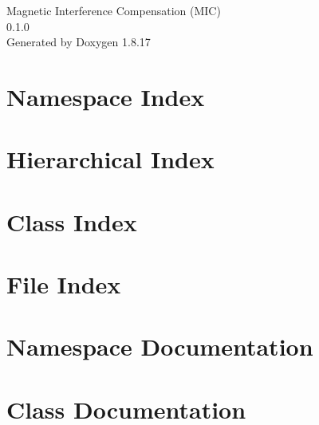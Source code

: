 \let\mypdfximage\pdfximage\def\pdfximage{\immediate\mypdfximage}\documentclass[twoside]{book}
\newcommand{\+}{\discretionary{\mbox{\scriptsize$\hookleftarrow$}}{}{}}
\newcommand{\clearemptydoublepage}{%
  \newpage{\pagestyle{empty}\cleardoublepage}%
}
\begin{document}
\hypersetup{pageanchor=false,
             bookmarksnumbered=true,
             pdfencoding=unicode
            }
\begin{titlepage}
\vspace*{7cm}
\begin{center}%
{\Large Magnetic Interference Compensation (M\+IC) \\[1ex]\large 0.\+1.\+0 }\\
\vspace*{1cm}
{\large Generated by Doxygen 1.8.17}\\
\end{center}
\end{titlepage}
\clearemptydoublepage
{}
\tableofcontents
\clearemptydoublepage
{}
\hypersetup{pageanchor=true}

\chapter{Namespace Index}

\chapter{Hierarchical Index}

\chapter{Class Index}

\chapter{File Index}

\chapter{Namespace Documentation}


\chapter{Class Documentation}






























\end{document}
